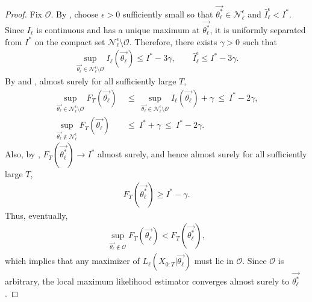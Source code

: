 \documentclass[pdflatex,sn-mathphys-num]{sn-jnl}%
\theoremstyle{thmstyleone}%
\theoremstyle{thmstyletwo}%
\theoremstyle{thmstylethree}%
\begin{document}
\begin{appendices}
\begin{proof}
    Fix $\mathcal O$.
    By , choose $\epsilon>0$ sufficiently small so that $\overrightarrow{\theta^*_\ell}\in\mathcal N_\ell^\epsilon$ and $\hat I_\ell^\epsilon<I^*$.
    Since $I_\ell$ is continuous and has a unique maximum at $\overrightarrow{\theta^*_\ell}$, it is uniformly separated from $I^*$ on the compact set $\mathcal N_\ell^\epsilon\setminus\mathcal O$.
    Therefore, there exists $\gamma>0$ such that
    \begin{align*}
        \sup_{\overrightarrow{\theta_\ell}\in\mathcal N_\ell^\epsilon\setminus\mathcal O}
        I_\ell\left(\overrightarrow{\theta_\ell}\right)
        \leq I^*-3\gamma,
        \qquad
        \hat I_\ell^\epsilon\leq I^*-3\gamma.
    \end{align*}
    By  and , almost surely for all sufficiently large $T$,
    \begin{align*}
         \sup_{\overrightarrow{\theta_\ell}\in\mathcal N_\ell^\epsilon\setminus\mathcal O}
        F_T\left(\overrightarrow{\theta_\ell}\right)
        &~\leq~ \sup_{\overrightarrow{\theta_\ell}\in\mathcal N_\ell^\epsilon\setminus\mathcal O}
        I_\ell\left(\overrightarrow{\theta_\ell}\right) + \gamma
        ~\leq~ I^*-2\gamma,\\
        \sup_{\overrightarrow{\theta_\ell}\notin\mathcal N_\ell^\epsilon}
        F_T\left(\overrightarrow{\theta_\ell}\right)
        &~\leq~ I^* + \gamma
        ~\leq~ I^*-2\gamma.
    \end{align*}
    Also, by , $F_T\left(\overrightarrow{\theta^*_\ell}\right)\to I^*$ almost surely, and hence almost surely for all sufficiently large $T$,
    \begin{align*}
        F_T\left(\overrightarrow{\theta^*_\ell}\right)
        \geq I^*-\gamma.
    \end{align*}
    Thus, eventually,
    \begin{align*}
        \sup_{\overrightarrow{\theta_\ell}\notin\mathcal O}
        F_T\left(\overrightarrow{\theta_\ell}\right)
        <
        F_T\left(\overrightarrow{\theta^*_\ell}\right),
    \end{align*}
    which implies that any maximizer of $L_\ell\left(X_{0:T}\big|\overrightarrow{\theta_\ell}\right)$ must lie in $\mathcal O$.
    Since $\mathcal O$ is arbitrary, the local maximum likelihood estimator converges almost surely to $\overrightarrow{\theta^*_\ell}$.
\end{proof}


\end{appendices}
\end{document}
